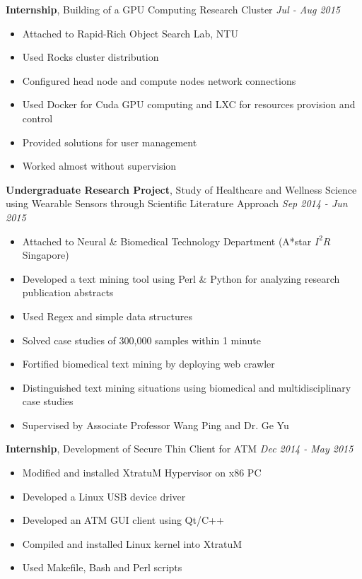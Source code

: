 \documentclass[a4paper, 12pt]{article}
\newenvironment{changemargin}[2]{%
  \begin{list}{}{%
      \setlength{\topsep}{0pt}%
      \setlength{\leftmargin}{#1}%
      \setlength{\rightmargin}{#2}%
      \setlength{\listparindent}{\parindent}%
      \setlength{\itemindent}{\parindent}%
      \setlength{\parsep}{\parskip}%
    }%
  \item[]}{\end{list}
}
\newenvironment{body}
{
\vspace*{-16pt}
\begin{changemargin}{-0.25in}{-0.5in}
}	
{
\end{changemargin}
}
\begin{document}
\begin{body}
  \vspace{14pt}

  \textbf{Internship}, {Building of a GPU Computing Research Cluster} \hfill \emph{Jul - Aug 2015}\\
  \vspace*{-4pt}
  \begin{itemize} \itemsep -0pt  \small
  \item Attached to Rapid-Rich Object Search Lab, NTU
  \item Used Rocks cluster distribution
  \item Configured head node and compute nodes network connections
  \item Used Docker for Cuda GPU computing and LXC for resources provision and control
  \item Provided solutions for user management
  \item Worked almost without supervision
  \end{itemize}

  \textbf{Undergraduate Research Project}, {Study of Healthcare and Wellness Science using Wearable Sensors through Scientific Literature Approach} \hfill \emph{Sep 2014 - Jun 2015}\\
  \vspace*{-4pt}
  \begin{itemize} \itemsep -0pt  \small
  \item Attached to Neural \& Biomedical Technology Department (A*star $I^{2}R$ Singapore)
  \item Developed a text mining tool using Perl \& Python for analyzing research publication abstracts
  \item Used Regex and simple data structures
  \item Solved case studies of 300,000 samples within 1 minute
  \item Fortified biomedical text mining by deploying web crawler
  \item Distinguished text mining situations using biomedical and multidisciplinary case studies
  \item Supervised by Associate Professor Wang Ping and Dr. Ge Yu
  \end{itemize}

  \textbf{Internship}, {Development of Secure Thin Client for ATM} \hfill \emph{Dec 2014 - May 2015}\\
  \vspace*{-4pt}
  \begin{itemize} \itemsep -0pt  \small
  \item Modified and installed XtratuM Hypervisor on x86 PC
  \item Developed a Linux USB device driver
  \item Developed an ATM GUI client using Qt/C++
  \item Compiled and installed Linux kernel into XtratuM
  \item Used Makefile, Bash and Perl scripts
  \end{itemize}


\end{body}
\end{document}
